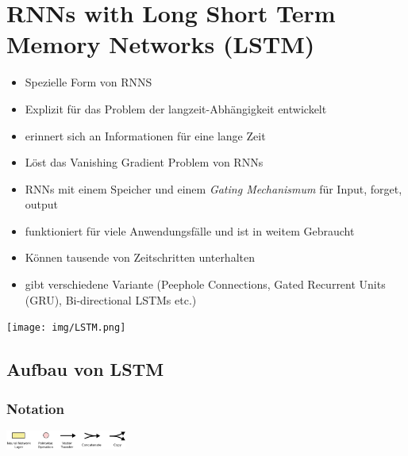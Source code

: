 \documentclass{article}
\newenvironment{Figure}
	{\par\medskip\noindent\minipage{\linewidth}}
	{\endminipage\par\medskip}
\theoremstyle{merke}
\theoremstyle{definition}
\begin{document}
    \section{RNNs with Long Short Term Memory Networks (LSTM)}
    \begin{itemize}
        \item Spezielle Form von RNNS
        \item Explizit für das Problem der langzeit-Abhängigkeit entwickelt
        \item erinnert sich an Informationen für eine lange Zeit
        \item Löst das Vanishing Gradient Problem von RNNs
        \item RNNs mit einem Speicher und einem \textit{Gating Mechanismum} für Input, forget, output
        \item funktioniert für viele Anwendungsfälle und ist in weitem Gebraucht
        \item Können tausende von Zeitschritten unterhalten
        \item gibt verschiedene Variante (Peephole Connections, Gated Recurrent Units (GRU), Bi-directional LSTMs etc.)
    \end{itemize}
    \begin{Figure}
    \centering
    \texttt{[image: img/LSTM.png]}
        \label{fig:Abbildung der Struktur eines LSTM}
    \end{Figure}
        
        \subsection{Aufbau von LSTM}
        
            \subsubsection{Notation}
            \begin{Figure}
            \centering
            \includegraphics[width=150px]{img/LSTMNotation.png}
                \label{fig:Notation eines LSTM}
            \end{Figure}
        
\end{document}

